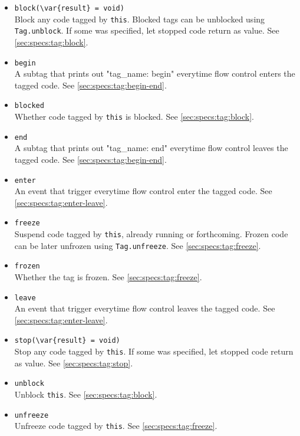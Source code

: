 \begin{itemize}
\item \lstinline|block(\var{result} = void)|\\
  Block any code tagged by \lstinline|this|.  Blocked tags can be
  unblocked using \lstinline|Tag.unblock|.  If some  was
  specified, let stopped code return  as value.  See
  \autoref{sec:specs:tag:block}.

\item \lstinline|begin|\\
  A subtag that prints out "tag\_name: begin" everytime flow control
  enters the tagged code. See \autoref{sec:specs:tag:begin-end}.

\item \lstinline|blocked|\\
  Whether code tagged by \lstinline|this| is blocked.  See
  \autoref{sec:specs:tag:block}.

\item \lstinline|end|\\
  A subtag that prints out "tag\_name: end" everytime flow control
  leaves the tagged code. See \autoref{sec:specs:tag:begin-end}.

\item \lstinline|enter|\\
  An event that trigger everytime flow control enter the tagged code.
  See \autoref{sec:specs:tag:enter-leave}.

\item \lstinline|freeze|\\
  Suspend code tagged by \lstinline|this|, already running or
  forthcoming.  Frozen code can be later unfrozen using
  \lstinline|Tag.unfreeze|.  See \autoref{sec:specs:tag:freeze}.

\item \lstinline|frozen|\\
  Whether the tag is frozen. See  \autoref{sec:specs:tag:freeze}.

\item \lstinline|leave|\\
  An event that trigger everytime flow control leaves the tagged code.
  See \autoref{sec:specs:tag:enter-leave}.

\item \lstinline|stop(\var{result} = void)|\\
  Stop any code tagged by \lstinline|this|.  If some  was
  specified, let stopped code return  as value.
  See \autoref{sec:specs:tag:stop}.

\item \lstinline|unblock|\\
  Unblock \lstinline|this|.  See \autoref{sec:specs:tag:block}.

\item \lstinline|unfreeze|\\
  Unfreeze code tagged by \lstinline|this|.  See
  \autoref{sec:specs:tag:freeze}.
\end{itemize}

